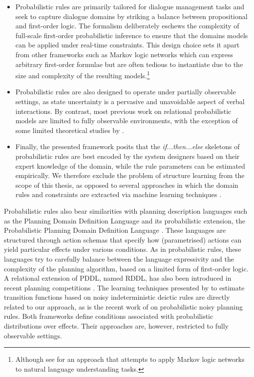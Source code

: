 \begin{itemize}

\item Probabilistic rules are primarily tailored for dialogue management tasks and seek to capture dialogue domains by striking a balance between propositional and first-order logic. The formalism deliberately eschews the complexity of full-scale first-order probabilistic inference to ensure that the domains models can be applied under real-time constraints. This design choice sets it apart from other frameworks such as Markov logic networks which can express arbitrary first-order formulae but are often tedious to instantiate due to the size and complexity of the resulting models.\footnote{Although see \cite{Kennington:2012} for an approach that attempts to apply Markov logic networks to natural language understanding tasks.} 

\item Probabilistic rules are also designed to operate under partially observable settings, as state uncertainty is a pervasive and unavoidable aspect of verbal interactions.  By contrast, most previous work on relational probabilistic models are limited to fully observable environments, with the exception of some limited theoretical studies by \cite{Wang:2010,SannerK10}. 

\item Finally, the presented framework posits that the \textit{if...then...else} skeletons of probabilistic rules are best encoded by the system designers based on their expert knowledge of the domain, while the rule parameters can be estimated empirically. We therefore exclude the problem of structure learning from the scope of this thesis, as opposed to several approaches in which the domain rules and constraints are extracted via machine learning techniques \citep{PasulaZK07,Kok:2009}.

\end{itemize}

Probabilistic rules also bear similarities with planning description languages such as the Planning Domain Definition Language \citep[PDDL, see ][]{mcdermott1998} and its probabilistic extension, the Probabilistic Planning Domain Definition Language \citep[PPDDL, see ][]{younes2004ppddl1}.  These languages are structured through action schemas that specify how (parametrised) actions can yield particular effects under various conditions. As in probabilistic rules, these languages try to carefully balance between the language expressivity and the complexity of the planning algorithm, based on a limited form of first-order logic. A relational extension of PDDL, named RDDL, has also been introduced in recent planning competitions \citep{Sanner:RDDL}. The learning techniques presented by \cite{PasulaZK07} to estimate transition functions based on noisy indeterministic deictic rules are directly related to our approach, as is the recent work of \cite{lang10jair} on probabilistic noisy planning rules.   Both frameworks define conditions associated with probabilistic distributions over effects. Their approaches are, however, restricted to fully observable settings. 

